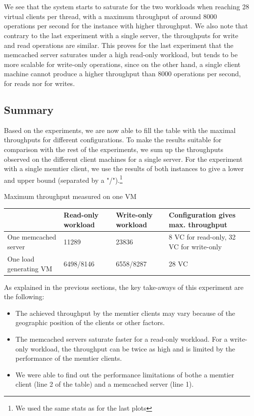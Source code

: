 \documentclass[11pt,a4paper]{article}
\begin{document}
\\
\\
We see that the system starts to saturate for the two workloads when reaching 28 virtual clients per thread, with a maximum throughput of around 8000 operations per second for the instance with higher throughput.  
We also note that contrary to the last experiment with a single server, the throughputs for write and read operations are similar. This proves for the last experiment that the memcached server saturates under a high read-only workload, but tends to be more scalable for write-only operations, since on the other hand, a single client machine cannot produce a higher throughput than 8000 operations per second, for reads nor for writes.   
\subsection{Summary}


Based on the experiments, we are now able to fill the table with the maximal throughputs for different configurations. To make the results suitable for comparison with the rest of the experiments, we sum up the throughputs observed on the different client machines for a single server. For the experiment with a single memtier client, we use the results of both instances to give a lower and upper bound (separated by a "/").\footnote{We used the same stats as for the last plots}

\begin{center}
	{Maximum throughput measured on one VM}
	\begin{tabular}{|l|p{2cm}|p{2cm}|p{4cm}|}
		\hline                        & Read-only workload & Write-only workload & Configuration gives max. throughput \\ 
		\hline One memcached server   &11289                    &23836                     &8 VC for read-only, 32  VC for write-only                                     \\ 
		\hline One load generating VM &6498/8146                    &6558/8287                     &28 VC                                     \\ 
		\hline 
	\end{tabular}
\end{center}
As explained in the previous sections, the key take-aways of this experiment are the following:

\begin{itemize}
\item The achieved throughput by the memtier clients may vary because of the geographic position of the clients or other factors. 
\item The memcached servers saturate faster for a read-only workload. For a write-only workload, the throughput can be twice as high and is limited by the performance of the memtier clients. 
\item We were able to find out the performance limitations of bothe a memtier client (line 2 of the table) and a memcached server (line 1). 
\end{itemize}
\newpage
\end{document}
